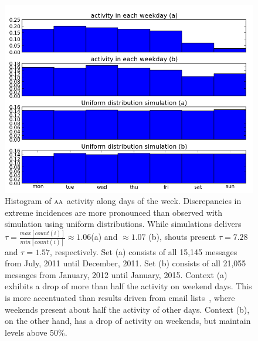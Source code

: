 \documentclass[a4paper, 11pt]{article} %
\newcommand{\aab}{\textsc{aa}}
\begin{document}
\begin{figure}[H]
    \hspace{-25mm}
    \includegraphics[width=1.3\textwidth]{imgs/weekdayHist}
    \caption{\small Histogram of \aab\ activity along days of the week. Discrepancies in extreme incidences are more pronounced than observed with simulation using uniform distributions. While simulations delivers $\tau=\frac{max[count(i)]}{min[count(i)]}\approx1.06$(a) and $\approx 1.07$ (b), shouts present $\tau=7.28$ and $\tau=1.57$, respectively. Set (a) consists of all 15,145 messages from July, 2011 until December, 2011. Set (b) consists of all 21,055 messages from January, 2012 until January, 2015. Context (a) exhibits a drop of more than half the activity on weekend days. This is more accentuated than results driven from email lists~\cite{rc1}, where weekends present about half the activity of other days. Context (b), on the other hand, has a drop of activity on weekends, but maintain levels above 50\%.}\label{fig:histWeekday}
\end{figure}
\end{document}
